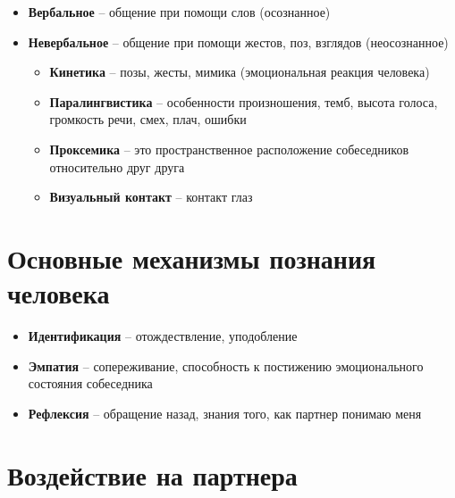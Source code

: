 \begin{itemize}
    \item \textbf{Вербальное} --
        общение при помощи слов (осознанное)
    \item \textbf{Невербальное} --
        общение при помощи жестов, поз, взглядов (неосознанное)

        \begin{itemize}
            \item \textbf{Кинетика} -- позы, жесты, мимика
                (эмоциональная реакция человека)

            \item \textbf{Паралингвистика} --
                особенности произношения, темб, высота
                голоса, громкость речи, смех, плач, ошибки

            \item \textbf{Проксемика} --
                это пространственное расположение
                собеседников относительно друг друга

            \item \textbf{Визуальный контакт} --
                контакт глаз
        \end{itemize}
\end{itemize}

\section{Основные механизмы познания человека}

\begin{itemize}
    \item \textbf{Идентификация} -- отождествление, уподобление
    \item \textbf{Эмпатия} --
        сопереживание, способность к постижению
        эмоционального состояния собеседника
    \item \textbf{Рефлексия} --
        обращение назад, знания того, как партнер понимаю меня
\end{itemize}

\section{Воздействие на партнера}

